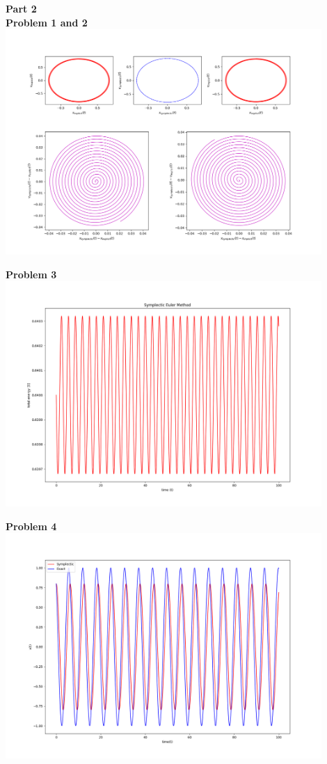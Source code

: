 \documentclass[12pt]{article}
\begin{document}
	\noindent\textbf{\large Part 2}\\
	
	\indent\textbf{Problem 1 and 2}\\
			\includegraphics[width=0.9\textwidth]{phaseSpace.png}

	\indent\textbf{Problem 3}\\
		\includegraphics[width=0.9\textwidth]{energySymplecticPlot.png}
	
	\indent\textbf{Problem 4}\\
		\includegraphics[width=0.9\textwidth]{vSymPlot.png}
		
\end{document}
